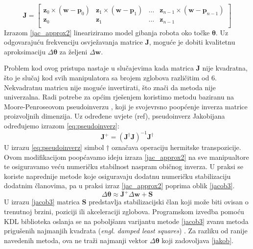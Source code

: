 \documentclass[times, utf8, diplomski, numeric]{fer}
\begin{document}
\begin{equation}
\mathbf{J} =
\begin{bmatrix}
\mathbf{z}_{0} \times (\mathbf{w} - \mathbf{p}_{0}) &\mathbf{z}_{1} \times (\mathbf{w} - \mathbf{p}_{1}) &\ldots &\mathbf{z}_{n-1} \times (\mathbf{w} - \mathbf{p}_{n-1})\\
\textbf{z}_{0} &\textbf{z}_{1} &\ldots &\textbf{z}_{n-1}\\
\end{bmatrix}
\label{jacob2}
\end{equation}
Izrazom \ref{jac_approx2} lineariziramo model gibanja robota oko točke $\bm{\theta}$. 
Uz odgovarajuću frekvenciju osvježavanja matrice $\mathbf{J}$, moguće je dobiti kvalitetnu aproksimaciju $\Delta \bm{\theta}$ za željeni $\Delta \mathbf{w}$.

Problem kod ovog pristupa nastaje u slučajevima kada matrica $\mathbf{J}$ nije kvadratna, što je slučaj kod svih manipulatora sa brojem zglobova različitim od 6.
Nekvadratnu matricu nije moguće invertirati, što znači da metoda nije univerzalna.
Radi potrebe za općim rješenjem koristimo metodu baziranu na Moore-Penroseovom pseudoinverzu \cite{klein1983review}, koji je svojevrsno poopćenje inverza matrice proizvoljnih dimenzija.
Uz određene uvjete (ref), pseudoinverz Jakobijana određujemo izrazom \ref{eq:pseudoinverz}:
\begin{equation}
\mathbf{J}^{+} = \left( \mathbf{J}^{\dagger} \mathbf{J}\right)^{-1}\mathbf{J}^{\dagger}
\label{eq:pseudoinverz}
\end{equation}
U izrazu \ref{eq:pseudoinverz} simbol $\dagger$ označava operaciju hermitske transpozicije.
Ovom modifikacijom poopćavamo ideju izraza \ref{jac_approx2} na sve manipualtore te osiguravamo veću numeričku stabilnost naspram običnog inverza.
U praksi se koriste naprednije metode koje osiguravaju dodatnu numeričku stabilizaciju dodatnim članovima, pa u praksi izraz \ref{jac_approx2} poprima oblik \ref{jacob3}.
\begin{equation}
\Delta \bm{\theta} \approx \mathbf{J}^{+} \Delta \textbf{w} + \mathbf{S}
\label{jacob3}
\end{equation}
U izrazu \ref{jacob3} matrica $\mathbf{S}$ predstavlja stabilizacijski član koji može biti ovisan o trenutnoj brzini, poziciji ili akceleraciji zglobova.
Programskom izvedba pomoću KDL biblioteka oslanja se na poboljšanu varijantu metode \ref{jacob3} zvanu metoda prigušenih najmanjih kvadrata (\textit{engl. damped least squares}) \cite{buss2005selectively}.
Za razliku od ranije navedenih metoda, ova ne traži najmanji vektor $\Delta \bm{\theta}$ koji zadovoljava \ref{jakob}.
\end{document}
